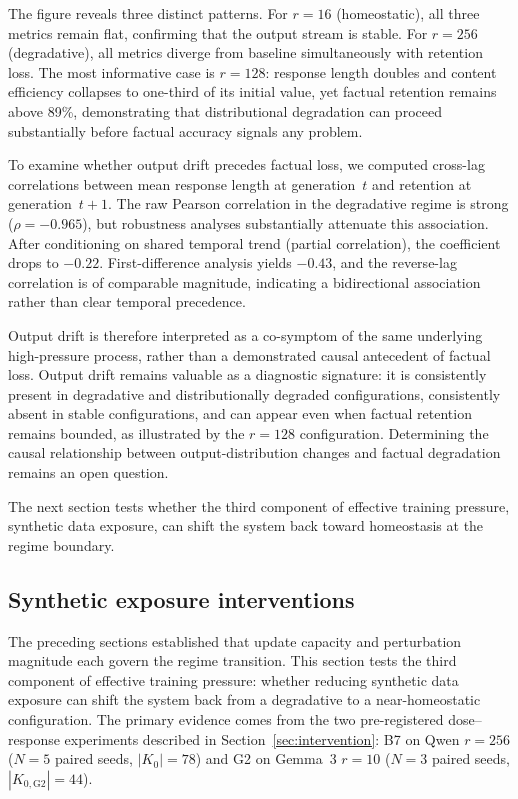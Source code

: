 \documentclass[a4paper,fleqn]{cas-dc}
\newif\ifshowchanges
\newcommand{\rev}[1]{\ifshowchanges{\color{blue}#1}\else{#1}\fi}
\newcommand{\Kcard}{\lvert K_0\rvert}
\begin{document}
The figure reveals three distinct patterns. For $r=16$ (homeostatic), all three
metrics remain flat, confirming that the output stream is stable. For $r=256$
(degradative), all metrics diverge from baseline simultaneously with retention
loss. The most informative case is $r=128$: response length doubles and content
efficiency collapses to one-third of its initial value, yet factual retention
remains above 89\%, demonstrating that distributional degradation can proceed
substantially before factual accuracy signals any problem.

To examine whether output drift precedes factual loss, we computed cross-lag
correlations between mean response length at generation~$t$ and retention at
generation~$t{+}1$. The raw Pearson correlation in the degradative regime is
strong ($\rho = -0.965$), but robustness analyses substantially attenuate this
association. After conditioning on shared temporal trend (partial correlation),
the coefficient drops to $-0.22$. First-difference analysis yields $-0.43$, and
the reverse-lag correlation is of comparable magnitude, indicating a
bidirectional association rather than clear temporal precedence.

Output drift is therefore interpreted as a co-symptom of the same underlying
high-pressure process, rather than a demonstrated causal antecedent of factual
loss. Output drift remains valuable as a diagnostic signature: it is
consistently present in degradative and distributionally degraded configurations,
consistently absent in stable configurations, and can appear even when factual
retention remains bounded, as illustrated by the $r=128$ configuration.
Determining the causal relationship between output-distribution changes and
factual degradation remains an open question.

The next section tests whether the third component of effective training
pressure, synthetic data exposure, can shift the system back toward homeostasis
at the regime boundary.

\FloatBarrier
\subsection{Synthetic exposure interventions}\label{sec:res_intervention}

The preceding sections established that update capacity and perturbation
magnitude each govern the regime transition. This section tests the third
component of effective training pressure: whether reducing synthetic data
exposure can shift the system back from a degradative to a near-homeostatic
configuration. The primary evidence comes from the two pre-registered
dose--response experiments described in Section~\ref{sec:intervention}:
B7 on Qwen $r=256$ (\rev{$N=5$} paired seeds, $\Kcard=78$) and G2 on Gemma~3 $r=10$
(\rev{$N=3$} paired seeds, $|K_{0,\mathrm{G2}}|=44$).
\end{document}
